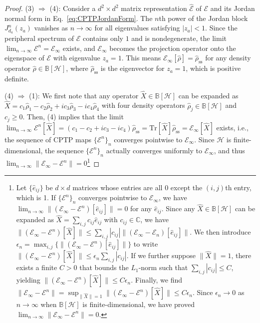 \documentclass[preprint,pteplogo]{ptephy_v2}%
\numberwithin{equation}{section}
\theoremstyle{definition}
\newcommand{\mc}[1]{\mathcal{#1}}
\newcommand{\mr}[1]{\mathrm{#1}}
\newcommand{\mbb}[1]{\mathbb{#1}}
\newcommand{\Tr}{\mr{Tr}}
\begin{document}
\begin{proof}
(3) $\Rightarrow$ (4): 
Consider a $d^2 \times d^2$ matrix representation $\hat{\mc{E}}$ of $\mc{E}$ and its Jordan normal form in Eq.~\eqref{eq:CPTPJordanForm}.
The $n$th power of the Jordan block $J^n_{d_a}(z_a)$ vanishes as $n \to \infty$ for all eigenvalues satisfying $|z_a| < 1$. 
Since the peripheral spectrum of $\mc{E}$ contains only $1$ and is nondegenerate, the limit $\lim_{n \to \infty}\mc{E}^n = \mc{E}_\infty$ exists, and $\mc{E}_\infty$ becomes the projection operator onto the eigenspace of $\mc{E}$ with eigenvalue $z_a=1$. 
This means $\mc{E}_\infty[\hat{\rho}] = \hat{\rho}_\mathrm{ss}$ for any density operator $\hat{\rho} \in \mbb{B}[\mc{H}]$, where $\hat{\rho}_\mathrm{ss}$ is the eigenvector for $z_a=1$, which is positive definite.

(4) $\Rightarrow$ (1):
We first note that any operator $\hat{X} \in \mbb{B}[\mc{H}]$ can be expanded as $\hat{X} = c_1 \hat{\rho}_1 -c_2 \hat{\rho}_2 +ic_3 \hat{\rho}_3 -ic_4 \hat{\rho}_4$ with four density operators $\hat{\rho}_j \in \mbb{B}[\mc{H}]$ and $c_j \geq 0$.
Then, (4) implies that the limit $\lim_{n \to \infty} \mc{E}^n[\hat{X}] = (c_1-c_2+ic_3-ic_4) \hat{\rho}_\mathrm{ss} = \Tr[\hat{X}] \hat{\rho}_\mathrm{ss} = \mc{E}_\infty[\hat{X}]$ exists, i.e., the sequence of CPTP maps $\{ \mc{E}^n \}_n$ converges pointwise to $\mc{E}_\infty$.
Since $\mc{H}$ is finite-dimensional, the sequence $\{ \mc{E}^n \}_n$ actually converges uniformly to $\mc{E}_\infty$, and thus $\lim_{n \to \infty} \| \mc{E}_\infty -\mc{E}^n \| = 0$\footnote{
Let $\{ \hat{e}_{ij} \}$ be $d \times d$ matrices whose entries are all 0 except the $(i,j)$th entry, which is 1.
If $\{\mc{E}^n\}_n$ converges pointwise to $\mc{E}_\infty$, we have $\lim_{n \to \infty} \| (\mc{E}_\infty -\mc{E}^n)[\hat{e}_{ij}] \| = 0$ for any $\hat{e}_{ij}$.
Since any $\hat{X} \in \mbb{B}[\mc{H}]$ can be expanded as $\hat{X} = \sum_{i,j} c_{ij} \hat{e}_{ij}$ with $c_{ij} \in \mbb{C}$, we have $\| (\mc{E}_\infty -\mc{E}^n)[\hat{X}] \| \leq \sum_{i,j} |c_{ij}| \| (\mc{E}_\infty -\mc{E}_n)[\hat{e}_{ij}] \|$.
We then introduce $\epsilon_n = \max_{i,j} \{ \| (\mc{E}_\infty-\mc{E}^n)[\hat{e}_{ij}] \| \}$ to write $\| (\mc{E}_\infty -\mc{E}^n)[\hat{X}] \| \leq \epsilon_n \sum_{i,j} |c_{ij}|$.
If we further suppose $\| \hat{X} \| = 1$, there exists a finite $C>0$ that bounds the $L_1$-norm such that $\sum_{i,j} |c_{ij}| \leq C$, yielding $\| (\mc{E}_\infty -\mc{E}^n)[\hat{X}] \| \leq C \epsilon_n$.
Finally, we find $\| \mc{E}_\infty -\mc{E}^n \| = \sup_{\| \hat{X} \|=1} \| (\mc{E}_\infty-\mc{E}^n)[\hat{X}] \| \leq C \epsilon_n$.
Since $\epsilon_n \to 0$ as $n \to \infty$ when $\mbb{B}[\mc{H}]$ is finite-dimensional, we have proved $\lim_{n \to \infty} \| \mc{E}_\infty - \mc{E}^n \| = 0$.
}
\end{proof}
\end{document}
